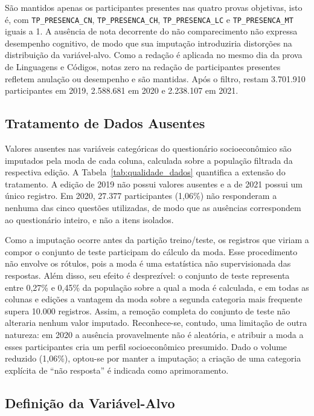 São mantidos apenas os participantes presentes nas quatro provas objetivas, isto é, com \texttt{TP\_PRESENCA\_CN}, \texttt{TP\_PRESENCA\_CH}, \texttt{TP\_PRESENCA\_LC} e \texttt{TP\_PRESENCA\_MT} iguais a 1. A ausência de nota decorrente do não comparecimento não expressa desempenho cognitivo, de modo que sua imputação introduziria distorções na distribuição da variável-alvo. Como a redação é aplicada no mesmo dia da prova de Linguagens e Códigos, notas zero na redação de participantes presentes refletem anulação ou desempenho e são mantidas. Após o filtro, restam 3.701.910 participantes em 2019, 2.588.681 em 2020 e 2.238.107 em 2021.

\subsection{Tratamento de Dados Ausentes}

Valores ausentes nas variáveis categóricas do questionário socioeconômico são imputados pela moda de cada coluna, calculada sobre a população filtrada da respectiva edição. A Tabela~\ref{tab:qualidade_dados} quantifica a extensão do tratamento. A edição de 2019 não possui valores ausentes e a de 2021 possui um único registro. Em 2020, 27.377 participantes (1,06\%) não responderam a nenhuma das cinco questões utilizadas, de modo que as ausências correspondem ao questionário inteiro, e não a itens isolados.



Como a imputação ocorre antes da partição treino/teste, os registros que viriam a compor o conjunto de teste participam do cálculo da moda. Esse procedimento não envolve os rótulos, pois a moda é uma estatística não supervisionada das respostas. Além disso, seu efeito é desprezível: o conjunto de teste representa entre 0,27\% e 0,45\% da população sobre a qual a moda é calculada, e em todas as colunas e edições a vantagem da moda sobre a segunda categoria mais frequente supera 10.000 registros. Assim, a remoção completa do conjunto de teste não alteraria nenhum valor imputado. Reconhece-se, contudo, uma limitação de outra natureza: em 2020 a ausência provavelmente não é aleatória, e atribuir a moda a esses participantes cria um perfil socioeconômico presumido. Dado o volume reduzido (1,06\%), optou-se por manter a imputação; a criação de uma categoria explícita de ``não resposta'' é indicada como aprimoramento.

\subsection{Definição da Variável-Alvo}

